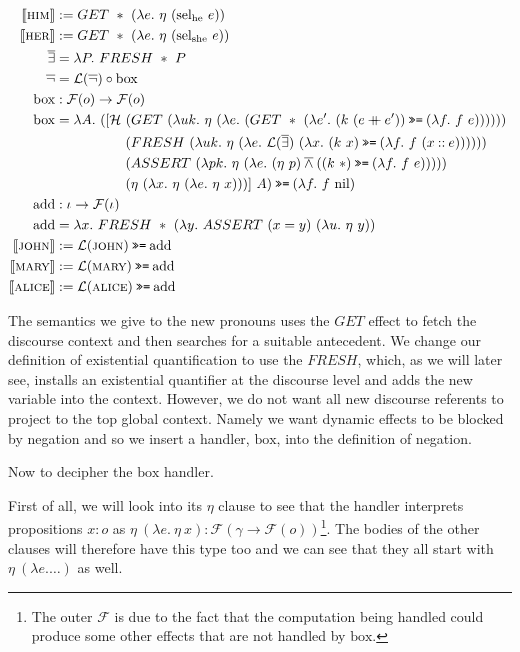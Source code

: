 \begin{align*}
  \lex{him}{GET\ *\ (\lambda e.\ \eta\ (\mathrm{sel_{he}}\ e))} \\
  \lex{her}{GET\ *\ (\lambda e.\ \eta\ (\mathrm{sel_{she}}\ e))} \\
  \dexists &= \lambda P.\ FRESH\ *\ P \\
  \dnot &= \mathcal{L}(\dnot) \circ \mathrm{box} \\
  \mathrm{box} &: \mathcal{F}(o) \to \mathcal{F}(o) \\
  \mathrm{box} &= \lambda A.\ ([\mathcal{H}\ 
      (GET\ (\lambda u k.\ \eta\ (\lambda e.\ (GET\ *\ (\lambda e'.\ (k\ (e \cat e')) \hsbind (\lambda f.\ f\ e))))))\ \\
    & \hskip 1.8cm (FRESH\ (\lambda u k.\ \eta\ (\lambda e.\ \mathcal{L}(\dexists)\ (\lambda x.\ (k\ x) \hsbind (\lambda f.\ f\ (x \cons e))))))\ \\
    & \hskip 1.8cm (ASSERT\ (\lambda p k.\ \eta\ (\lambda e.\ (\eta\ p) \dand ((k\ *) \hsbind (\lambda f.\ f\ e)))))\ \\
    & \hskip 1.8cm (\eta\ (\lambda x.\ \eta\ (\lambda e.\ \eta\ x)))]\ A) \hsbind (\lambda f.\ f\ \mathrm{nil}) \\
  \mathrm{add} &: \iota \to \mathcal{F}(\iota) \\
  \mathrm{add} &= \lambda x.\ FRESH\ *\ (\lambda y.\ ASSERT\ (x = y)\ (\lambda u.\ \eta\ y)) \\
  \lex{john}{\mathcal{L}(\abs{john}) \hsbind \mathrm{add}} \\
  \lex{mary}{\mathcal{L}(\abs{mary}) \hsbind \mathrm{add}} \\
  \lex{alice}{\mathcal{L}(\abs{alice}) \hsbind \mathrm{add}} \\
\end{align*}

The semantics we give to the new pronouns uses the $GET$ effect to fetch
the discourse context and then searches for a suitable antecedent. We
change our definition of existential quantification to use the $FRESH$,
which, as we will later see, installs an existential quantifier at the
discourse level and adds the new variable into the context. However, we do
not want all new discourse referents to project to the top global
context. Namely we want dynamic effects to be blocked by negation and so we
insert a handler, $\mathrm{box}$, into the definition of negation.

Now to decipher the $\mathrm{box}$ handler.

First of all, we will look into its $\eta$ clause to see that the handler
interprets propositions $x : o$ as $\eta\ (\lambda e.\ \eta\ x) :
\mathcal{F}(\gamma \to \mathcal{F}(o))$\footnote{The outer $\mathcal{F}$ is
  due to the fact that the computation being handled could produce some
  other effects that are not handled by $\mathrm{box}$.}. The bodies of the
other clauses will therefore have this type too and we can see that they
all start with $\eta\ (\lambda e. \ldots)$ as well.

